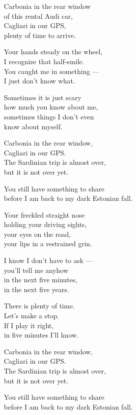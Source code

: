 \begin{lyrics}
Carbonia in the rear window\\
of this rental Audi car,\\
Cagliari in our GPS,\\
plenty of time to arrive.

Your hands steady on the wheel,\\
I recognize that half-smile.\\
You caught me in something —\\
I just don't know what.

Sometimes it is just scary\\
how much you know about me,\\
sometimes things I don't even\\
know about myself.

Carbonia in the rear window,\\
Cagliari in our GPS.\\
The Sardinian trip is almost over,\\
but it is not over yet.

You still have something to share\\
before I am back to my dark Estonian fall.

Your freckled straight nose\\
holding your driving sights,\\
your eyes on the road,\\
your lips in a restrained grin.

I know I don't have to ask —\\
you'll tell me anyhow\\
in the next five minutes,\\
in the next five years.

There is plenty of time.\\
Let's make a stop.\\
If I play it right,\\
in five minutes I'll know.

Carbonia in the rear window,\\
Cagliari in our GPS.\\
The Sardinian trip is almost over,\\
but it is not over yet.

You still have something to share\\
before I am back to my dark Estonian fall.


\end{lyrics}
